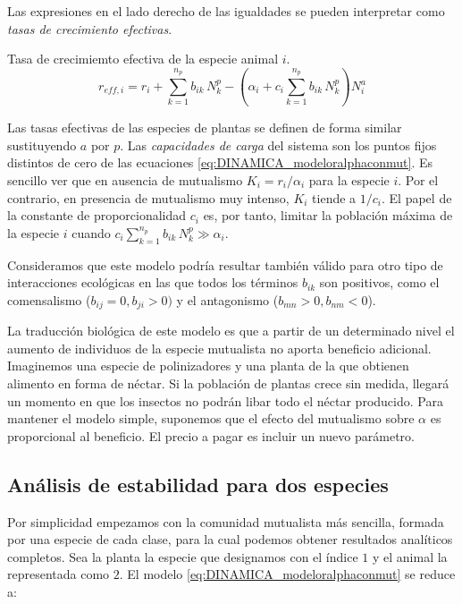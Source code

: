 Las expresiones en el lado derecho de las igualdades se pueden interpretar como \textit{tasas de crecimiento efectivas}. 

\begin{theo} 
Tasa de crecimiemto efectiva de la especie animal $i$.
\begin{equation}
r_{eff,i} = r_{i} + \sum_{k=1}^{n_{p}} b_{ik}\, N^{p}_k - \left( \alpha_{i}+ c_{i} \sum_{k=1}^{n_{p}} b_{ik}\, N^{p}_k \right) N^{a}_{i}
\label{eq:DINAMICA_effrate}
\end{equation}
\end{theo}

Las tasas efectivas de las especies de plantas se definen de forma similar sustituyendo $a$ por $p$. Las \textit{capacidades de carga} del sistema son los puntos fijos distintos de cero de las ecuaciones \ref{eq:DINAMICA_modeloralphaconmut}. Es sencillo ver que en ausencia de mutualismo $K_i = r_i/\alpha_i$ para la especie $i$. Por el contrario, en presencia de mutualismo muy intenso, $K_i$ tiende a $1/c_{i}$. El papel de la constante de proporcionalidad $c_i$ es, por tanto, limitar la población máxima de la especie $i$ cuando $c_{i} \sum_{k=1}^{n_p} b_{ik} \, N^p_{k} \gg \alpha_{i}$. 

Consideramos que este modelo podría resultar también válido para otro tipo de interacciones ecológicas en las que todos los términos $b_{ik}$ son positivos, como el comensalismo ($b_{ij}=0, b_{ji}>0)$ y el antagonismo ($b_{mn}>0,b_{nm}<0$). 

La traducción biológica de este modelo es que a partir de un determinado nivel el aumento de individuos de la especie mutualista no aporta beneficio adicional. Imaginemos una especie de polinizadores y una planta de la que obtienen alimento en forma de néctar. Si la población de plantas crece sin medida, llegará un momento en que los insectos no podrán libar todo el néctar producido. Para mantener el modelo simple, suponemos que el efecto del mutualismo sobre $\alpha$ es proporcional al beneficio. El precio a pagar es incluir un nuevo parámetro.

\subsection{Análisis de estabilidad para dos especies}

Por simplicidad empezamos con la comunidad mutualista más sencilla, formada por una especie de cada clase, para la cual podemos obtener resultados analíticos completos. Sea la planta la especie que designamos con el índice $1$ y el animal la representada como $2$. El modelo \ref{eq:DINAMICA_modeloralphaconmut} se reduce a:

